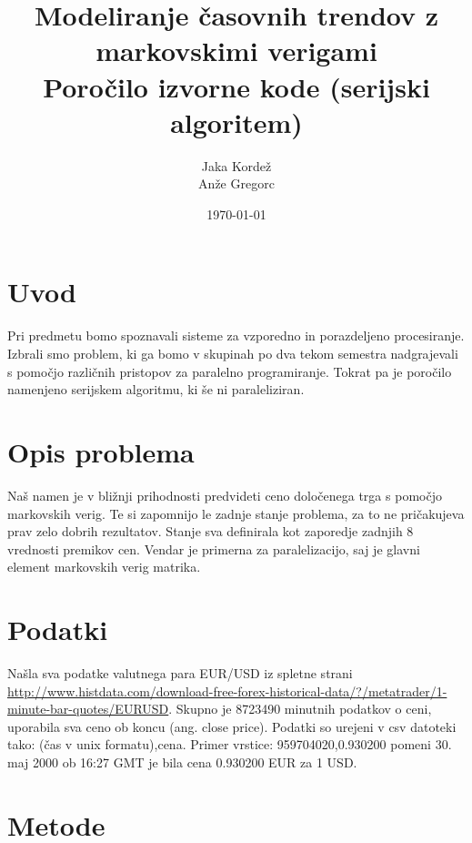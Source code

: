 \documentclass[a4paper,11pt]{article}
\title{Modeliranje časovnih trendov z markovskimi verigami \\ \large  Poročilo izvorne kode (serijski algoritem)}
\author{Jaka Kordež \\ Anže Gregorc}
\date{\today}
\begin{document}
\maketitle

\section{Uvod}

Pri predmetu bomo spoznavali sisteme za vzporedno in porazdeljeno procesiranje. Izbrali smo problem, ki ga bomo v skupinah po dva tekom semestra nadgrajevali s pomočjo različnih pristopov za paralelno programiranje. Tokrat pa je poročilo namenjeno serijskem algoritmu, ki še ni paraleliziran. 

\section{Opis problema}

Naš namen je v bližnji prihodnosti predvideti ceno določenega trga s pomočjo markovskih verig. Te si zapomnijo le zadnje stanje problema, za to ne pričakujeva prav zelo dobrih rezultatov. Stanje sva definirala kot zaporedje zadnjih 8 vrednosti premikov cen. Vendar je primerna za paralelizacijo, saj je glavni element markovskih verig matrika.

\section{Podatki}

Našla sva podatke valutnega para EUR/USD iz spletne strani \url{http://www.histdata.com/download-free-forex-historical-data/?/metatrader/1-minute-bar-quotes/EURUSD}. Skupno je 8723490 minutnih podatkov o ceni, uporabila sva ceno ob koncu (ang. close price). Podatki so urejeni v csv datoteki tako: (čas v unix formatu),cena. Primer vrstice: 959704020,0.930200 pomeni 30. maj 2000 ob 16:27 GMT je bila cena 0.930200 EUR za 1 USD.

\section{Metode}
\end{document}
